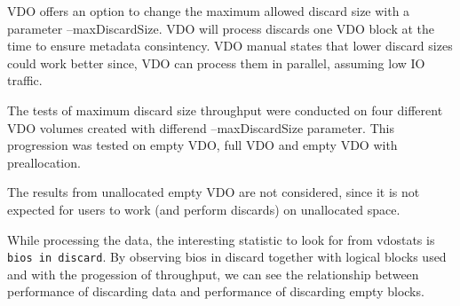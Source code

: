 \documentclass[
  color, %
  table, %
  lof,   %
  lot,   %
]{fithesis3}
\begin{document}
VDO offers an option to change the maximum allowed discard size with a parameter --maxDiscardSize. VDO will process discards one VDO block at the time to ensure metadata consintency. VDO manual states that lower discard sizes could work better since, VDO can process them in parallel, assuming low IO traffic.

The tests of maximum discard size throughput were conducted on four different VDO volumes created with differend --maxDiscardSize parameter. This progression was tested on empty VDO, full VDO and empty VDO with preallocation.

The results from unallocated empty VDO are not considered, since it is not expected for users to work (and perform discards) on unallocated space.

While processing the data, the interesting statistic to look for from vdostats is \texttt{bios in discard}. By observing bios in discard together with logical blocks used and with the progession of throughput, we can see the relationship between performance of discarding data and performance of discarding empty blocks.
\end{document}
